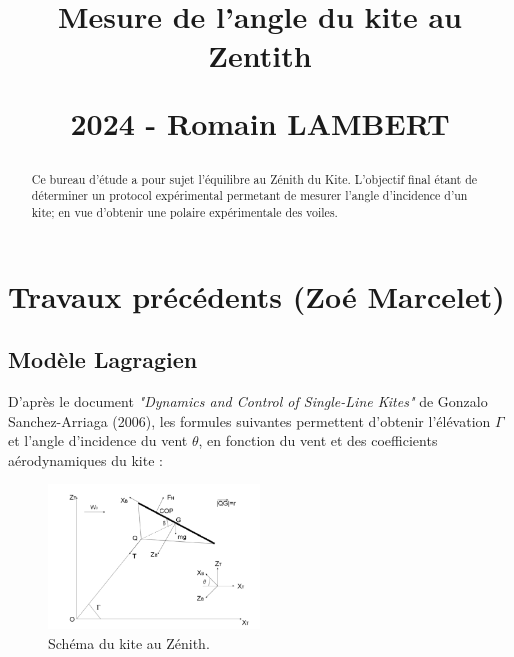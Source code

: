 \documentclass[conference]{IEEEtran}
\begin{document}
\title{\LARGE Mesure de l'angle du kite au Zentith 
\vskip10pt

\small 2024 - Romain LAMBERT
}
\maketitle

\begin{abstract}Ce bureau d'étude a pour sujet l'équilibre au Zénith du Kite. L'objectif final étant de déterminer un protocol expérimental permetant de mesurer l'angle d'incidence d'un kite; en vue d'obtenir une polaire expérimentale des voiles. 
\end{abstract}
\IEEEoverridecommandlockouts

\IEEEpeerreviewmaketitle
\section{Travaux précédents (Zoé Marcelet)}

\subsection{Modèle Lagragien} 

D'après le document \textit{"Dynamics and Control of Single-Line Kites"} de Gonzalo Sanchez-Arriaga (2006),  les formules suivantes permettent d'obtenir l'élévation $\Gamma$ et l'angle d'incidence du vent $\theta$, en fonction du vent et des coefficients aérodynamiques du kite : \\

\begin{figure}[H]
    \centering
    \includegraphics[width=0.5\textwidth]{Pics/Picture Sanchez.png}  
    \caption{Schéma du kite au Zénith.}
    \label{fig:sanchez}
\end{figure}
\end{document}
